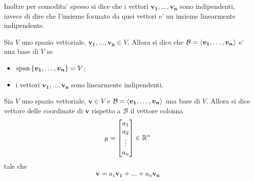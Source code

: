 Inoltre per comodita' spesso si dice che i vettori $\bm{v_1}, \dots, \bm{v_n}$ sono indipendenti, invece di dire che l'insieme formato da quei vettori e' un insieme linearmente indipendente.

\begin{definition}
    Sia $V$ uno spazio vettoriale, $\bm{v_1}, \dots, \bm{v_n} \in V$. Allora si dice che $\mathcal{B} = \left\langle \bm{v_1}, \dots, \bm{v_n} \right\rangle$ e' una base di $V$ se
    \begin{itemize}
        \item $\operatorname{span}\left\{\bm{v_1}, \dots, \bm{v_n}\right\} = V$;
        \item i vettori $\bm{v_1}, \dots, \bm{v_n}$ sono linearmente indipendenti.
    \end{itemize}
\end{definition}

\begin{definition}
    Sia $V$ uno spazio vettoriale, $\bm{v} \in V$ e $\mathcal{B} = \left\langle \bm{v_1}, \dots, \bm{v_n} \right\rangle$ una base di $V$. Allora si dice vettore delle coordinate di $\bm{v}$ rispetto a $\mathcal{B}$ il vettore colonna
    \begin{equation}
        [\bm{v}]_{\mathcal{B}} = \begin{bmatrix}
                                    a_1 \\
                                    a_2 \\
                                    \vdots \\
                                    a_n
                                 \end{bmatrix} \in \R^n
    \end{equation}
    tale che \begin{equation}
        \bm{v} = a_1\bm{v_1} + \dots + a_n\bm{v_n}
    \end{equation}
\end{definition}

